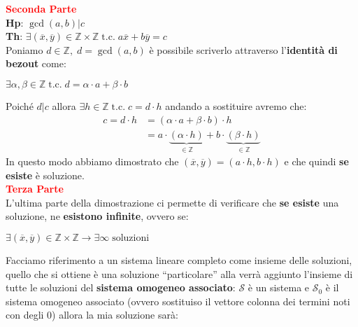 \begin{boxA}
    \textcolor{red}{\textbf{Seconda Parte}} \\
    \textbf{Hp}: $\gcd (a, b)|c$ \\
    \textbf{Th}: $\exists (\overline{x}, \overline{y}) \in \mathbb{Z} \times \mathbb{Z} \; \text{t.c.} \; a\overline{x} + b\overline{y} = c$ \\
    Poniamo $d \in \mathbb{Z}, \; d = \gcd (a, b)$ è possibile scriverlo attraverso l'\textbf{identità di bezout} come:
    
    {\centering
        $\exists \alpha, \beta \in \mathbb{Z} \; \text{t.c.} \; d = \alpha \cdot a + \beta \cdot b$
    \par}
    Poiché $d|c$ allora $\exists h \in \mathbb{Z} \; \text{t.c.} \; c = d \cdot h$ andando a sostituire avremo che:
    \begin{align*}
        c = d \cdot h &= (\alpha \cdot a + \beta \cdot b) \cdot h \\
        &= a \cdot \underset{\in \mathbb{Z}}{\underbrace{(\alpha \cdot h)}} + b \cdot \underset{\in \mathbb{Z}}{\underbrace{(\beta \cdot h)}}
    \end{align*}
    In questo modo abbiamo dimostrato che $(\overline{x}, \overline{y}) = (a \cdot h, b \cdot h)$ e che quindi \textbf{se esiste} è soluzione. \\ \newline
    \textcolor{red}{\textbf{Terza Parte}} \\
    L'ultima parte della dimostrazione ci permette di verificare che \textbf{se esiste} una soluzione, ne \textbf{esistono infinite}, ovvero se:

    {\centering
        $\exists (\overline{x}, \overline{y}) \in \mathbb{Z} \times \mathbb{Z} \rightarrow \exists \infty \; \text{soluzioni}$
    \par}
    Facciamo riferimento a un sistema lineare completo come insieme delle soluzioni, quello che si ottiene è una soluzione ``particolare'' alla verrà aggiunto l'insieme di tutte le soluzioni del \textbf{sistema omogeneo associato}: $\mathcal{S}$ è un sistema e $\mathcal{S}_0$ è il sistema omogeneo associato (ovvero sostituiso il vettore colonna dei termini noti con degli $0$) allora la mia soluzione sarà:
    

\end{boxA}
